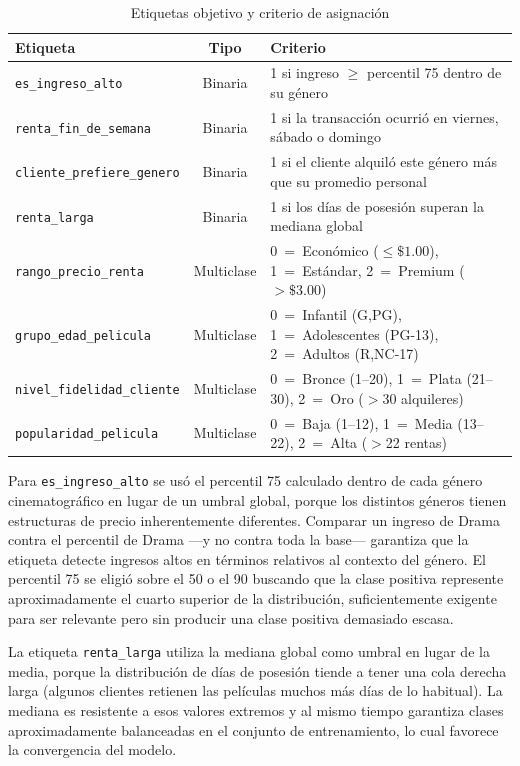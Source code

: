 \documentclass[12pt, a4paper]{report}
\newcommand{\variable}[1]{\texttt{\small #1}}
\begin{document}
\begin{table}[H]
\centering
\caption{Etiquetas objetivo y criterio de asignación}
\label{tab:etiquetas}
\begin{tabular}{@{} l c p{7cm} @{}}
\toprule
\textbf{Etiqueta} & \textbf{Tipo} & \textbf{Criterio} \\
\midrule
\variable{es\_ingreso\_alto}         & Binaria    & 1 si ingreso $\geq$ percentil 75 dentro de su género \\
\variable{renta\_fin\_de\_semana}    & Binaria    & 1 si la transacción ocurrió en viernes, sábado o domingo \\
\variable{cliente\_prefiere\_genero} & Binaria    & 1 si el cliente alquiló este género más que su promedio personal \\
\variable{renta\_larga}              & Binaria    & 1 si los días de posesión superan la mediana global \\
\midrule
\variable{rango\_precio\_renta}      & Multiclase & 0~=~Económico ($\leq\$1.00$), 1~=~Estándar, 2~=~Premium ($>\$3.00$) \\
\variable{grupo\_edad\_pelicula}     & Multiclase & 0~=~Infantil (G,PG), 1~=~Adolescentes (PG-13), 2~=~Adultos (R,NC-17) \\
\variable{nivel\_fidelidad\_cliente} & Multiclase & 0~=~Bronce (1--20), 1~=~Plata (21--30), 2~=~Oro ($>$30 alquileres) \\
\variable{popularidad\_pelicula}     & Multiclase & 0~=~Baja (1--12), 1~=~Media (13--22), 2~=~Alta ($>$22 rentas) \\
\bottomrule
\end{tabular}
\end{table}

Para \variable{es\_ingreso\_alto} se usó el percentil 75 calculado dentro de cada género cinematográfico en lugar de un umbral global, porque los distintos géneros tienen estructuras de precio inherentemente diferentes. Comparar un ingreso de Drama contra el percentil de Drama ---y no contra toda la base--- garantiza que la etiqueta detecte ingresos altos en términos relativos al contexto del género. El percentil 75 se eligió sobre el 50 o el 90 buscando que la clase positiva represente aproximadamente el cuarto superior de la distribución, suficientemente exigente para ser relevante pero sin producir una clase positiva demasiado escasa.

La etiqueta \variable{renta\_larga} utiliza la mediana global como umbral en lugar de la media, porque la distribución de días de posesión tiende a tener una cola derecha larga (algunos clientes retienen las películas muchos más días de lo habitual). La mediana es resistente a esos valores extremos y al mismo tiempo garantiza clases aproximadamente balanceadas en el conjunto de entrenamiento, lo cual favorece la convergencia del modelo.
\end{document}
